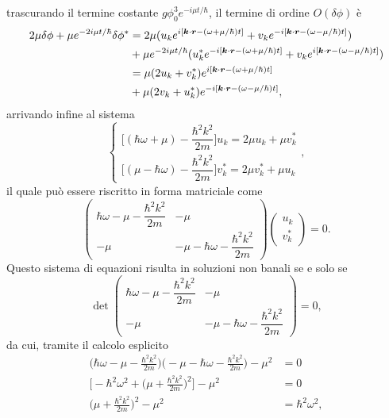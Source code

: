 trascurando il termine costante $g\phi_0^3e^{-i\mu t/\hbar}$, il termine di ordine $O(\delta\phi)$ è
\begin{equation}
    \begin{split}
        2\mu\delta\phi + \mu e^{-2i\mu t/\hbar}\delta\phi^* &= 2\mu(u_ke^{i[\bm{k}\cdot\bm{r} - (\omega + \mu/\hbar)t]} + v_ke^{-i[\bm{k}\cdot\bm{r} - (\omega - \mu/\hbar)t]}) \\
        &+ \mu e^{-2i\mu t/\hbar}(u_k^*e^{-i[\bm{k}\cdot\bm{r} - (\omega + \mu/\hbar)t]} + v_ke^{i[\bm{k}\cdot\bm{r} - (\omega - \mu/\hbar)t]}) \\
        &= \mu(2u_k + v_k^*)e^{i[\bm{k}\cdot\bm{r} - (\omega + \mu/\hbar)t]} \\
        &+ \mu(2v_k + u_k^*)e^{-i[\bm{k}\cdot\bm{r} - (\omega - \mu/\hbar)t]},
    \end{split}
\end{equation}
arrivando infine al sistema 
\begin{equation}
    \begin{cases}
        \bigg[(\hbar\omega + \mu) - \dfrac{\hbar^2k^2}{2m}\bigg]u_k = 2\mu u_k + \mu v_k^* \\[2ex]
        \bigg[(\mu - \hbar\omega) - \dfrac{\hbar^2k^2}{2m}\bigg]v_k^* = 2\mu v_k^* + \mu u_k
    \end{cases},
\end{equation}
il quale può essere riscritto in forma matriciale come
\begin{equation}
    \begin{pmatrix}
        \hbar\omega - \mu - \dfrac{\hbar^2k^2}{2m} & -\mu \\
        -\mu & -\mu - \hbar\omega - \dfrac{\hbar^2k^2}{2m}
    \end{pmatrix}
    \begin{pmatrix}
        u_k \\
        v_k^*
    \end{pmatrix}
    = 0.
\end{equation}
Questo sistema di equazioni risulta in soluzioni non banali se e solo se 
\begin{equation}
    \det{
    \begin{pmatrix}
        \hbar\omega - \mu - \dfrac{\hbar^2k^2}{2m} & -\mu \\
        -\mu & -\mu - \hbar\omega - \dfrac{\hbar^2k^2}{2m}
    \end{pmatrix}
    } = 0,
\end{equation}
da cui, tramite il calcolo esplicito
\begin{equation}
    \begin{split}
        \bigg(\hbar\omega - \mu - \frac{\hbar^2k^2}{2m}\bigg)\bigg(-\mu - \hbar\omega - \frac{\hbar^2k^2}{2m}\bigg) - \mu^2& = 0 \\
        \bigg[- \hbar^2\omega^2 + \bigg(\mu + \frac{\hbar^2k^2}{2m}\bigg)^2\bigg] - \mu^2 &= 0 \\
        \bigg(\mu + \frac{\hbar^2k^2}{2m}\bigg)^2 - \mu^2 &= \hbar^2\omega^2,
    \end{split}
\end{equation}
